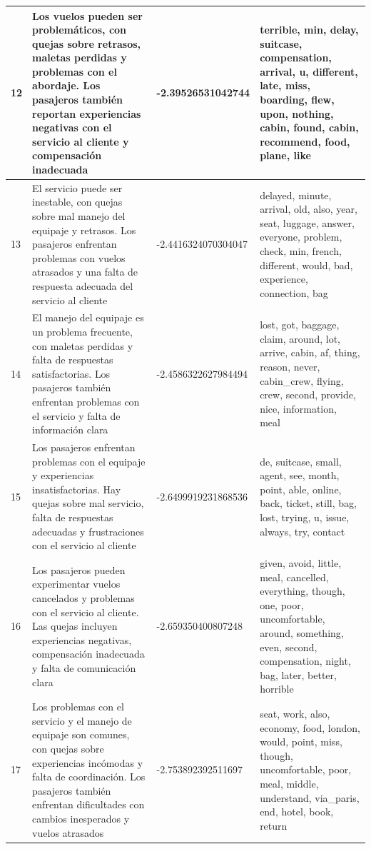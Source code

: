 \documentclass{report}
\begin{document}
\begin{longtable}{|p{1cm}|p{4cm}|p{4cm}|p{6cm}|}
                    \hline
                    12 & Los vuelos pueden ser problemáticos, con quejas sobre retrasos, maletas perdidas y problemas con el abordaje. Los pasajeros también reportan experiencias negativas con el servicio al cliente y compensación inadecuada & -2.39526531042744 & terrible, min, delay, suitcase, compensation, arrival, u, different, late, miss, boarding, flew, upon, nothing, cabin, found, cabin, recommend, food, plane, like \\
                    \hline
                    13 & El servicio puede ser inestable, con quejas sobre mal manejo del equipaje y retrasos. Los pasajeros enfrentan problemas con vuelos atrasados y una falta de respuesta adecuada del servicio al cliente & -2.4416324070304047 & delayed, minute, arrival, old, also, year, seat, luggage, answer, everyone, problem, check, min, french, different, would, bad, experience, connection, bag \\
                    \hline
                    14 & El manejo del equipaje es un problema frecuente, con maletas perdidas y falta de respuestas satisfactorias. Los pasajeros también enfrentan problemas con el servicio y falta de información clara & -2.4586322627984494 & lost, got, baggage, claim, around, lot, arrive, cabin, af, thing, reason, never, cabin\_crew, flying, crew, second, provide, nice, information, meal \\
                    \hline
                    15 & Los pasajeros enfrentan problemas con el equipaje y experiencias insatisfactorias. Hay quejas sobre mal servicio, falta de respuestas adecuadas y frustraciones con el servicio al cliente & -2.6499919231868536 & de, suitcase, small, agent, see, month, point, able, online, back, ticket, still, bag, lost, trying, u, issue, always, try, contact \\
                    \hline
                    16 & Los pasajeros pueden experimentar vuelos cancelados y problemas con el servicio al cliente. Las quejas incluyen experiencias negativas, compensación inadecuada y falta de comunicación clara & -2.659350400807248 & given, avoid, little, meal, cancelled, everything, though, one, poor, uncomfortable, around, something, even, second, compensation, night, bag, later, better, horrible \\
                    \hline
                    17 & Los problemas con el servicio y el manejo de equipaje son comunes, con quejas sobre experiencias incómodas y falta de coordinación. Los pasajeros también enfrentan dificultades con cambios inesperados y vuelos atrasados & -2.753892392511697 & seat, work, also, economy, food, london, would, point, miss, though, uncomfortable, poor, meal, middle, understand, via\_paris, end, hotel, book, return \\

\end{longtable}
\end{document}
